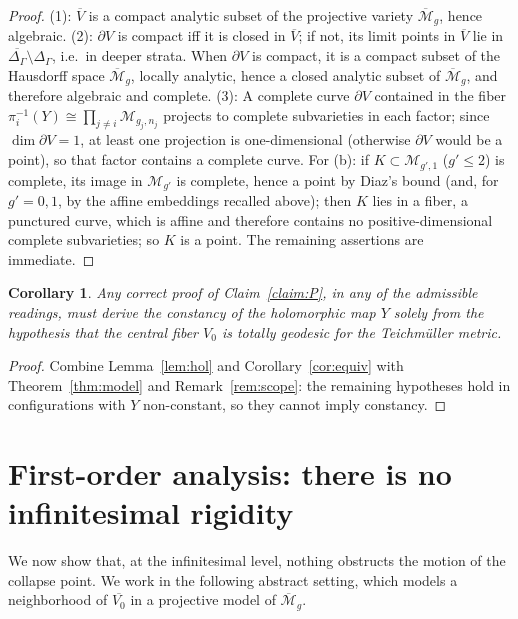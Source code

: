 \documentclass[11pt]{amsart}
\newcommand{\M}{\mathcal{M}}
\theoremstyle{plain}
\newtheorem{corollary}[theorem]{Corollary}
\theoremstyle{definition}
\theoremstyle{remark}
\begin{document}
\begin{proof}
(1): $\overline{V}$ is a compact analytic subset of the projective variety
$\overline{\M}_g$, hence algebraic. (2): $\partial V$ is compact iff it is closed in
$\overline{V}$; if not, its limit points in $\overline{V}$ lie in
$\overline{\Delta_\Gamma}\setminus\Delta_\Gamma$, i.e.\ in deeper strata. When
$\partial V$ is compact, it is a compact subset of the Hausdorff space
$\overline{\M}_g$, locally analytic, hence a closed analytic subset of
$\overline{\M}_g$, and therefore algebraic and complete. (3): A complete curve
$\partial V$ contained in the fiber $\pi_i^{-1}(Y)\cong\prod_{j\ne i}\M_{g_j,n_j}$
projects to complete subvarieties in each factor; since $\dim\partial V=1$, at least
one projection is one-dimensional (otherwise $\partial V$ would be a point), so that
factor contains a complete curve. For (b): if $K\subset \M_{g',1}$ ($g'\le 2$) is
complete, its image in $\M_{g'}$ is complete, hence a point by Diaz's bound (and,
for $g'=0,1$, by the affine embeddings recalled above); then $K$ lies in a fiber, a
punctured curve, which is affine and therefore contains no positive-dimensional
complete subvarieties; so $K$ is a point. The remaining assertions are immediate.
\end{proof}

\begin{corollary}\label{cor:burden}
Any correct proof of Claim~\ref{claim:P}, in any of the admissible readings, must
derive the constancy of the holomorphic map $Y$ solely from the hypothesis that the
central fiber $V_0$ is totally geodesic for the Teichm\"uller metric.
\end{corollary}

\begin{proof}
Combine Lemma~\ref{lem:hol} and Corollary~\ref{cor:equiv} with
Theorem~\ref{thm:model} and Remark~\ref{rem:scope}: the remaining hypotheses hold in
configurations with $Y$ non-constant, so they cannot imply constancy.
\end{proof}

\section{First-order analysis: there is no infinitesimal rigidity}\label{sec:inflect}

We now show that, at the infinitesimal level, nothing obstructs the motion of the
collapse point. We work in the following abstract setting, which models a neighborhood
of $\overline{V_0}$ in a projective model of $\overline{\M}_g$.
\end{document}

